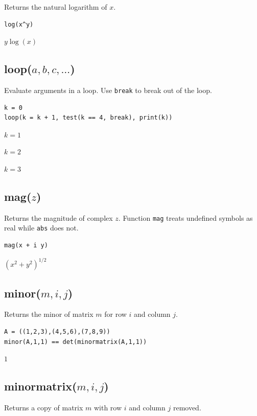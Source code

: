 \documentclass[12pt]{article}
\begin{document}
Returns the natural logarithm of $x$.

{\color{blue}
\begin{verbatim}
log(x^y)
\end{verbatim}
}

$y\log(x)$

\subsection*{loop($a,b,c,\ldots$)}

Evaluate arguments in a loop. Use \verb$break$ to break out of the loop.

{\color{blue}
\begin{verbatim}
k = 0
loop(k = k + 1, test(k == 4, break), print(k))
\end{verbatim}
}

$k=1$

$k=2$

$k=3$

\subsection*{mag($z$)}

Returns the magnitude of complex $z$.
Function {\tt mag} treats undefined symbols as real while {\tt abs} does not.

{\color{blue}
\begin{verbatim}
mag(x + i y)
\end{verbatim}
}

$\displaystyle (x^2+y^2)^{1/2}$

\subsection*{minor($m,i,j$)}

Returns the minor of matrix $m$ for row $i$ and column $j$.

{\color{blue}
\begin{verbatim}
A = ((1,2,3),(4,5,6),(7,8,9))
minor(A,1,1) == det(minormatrix(A,1,1))
\end{verbatim}
}

$1$

\subsection*{minormatrix($m,i,j$)}

Returns a copy of matrix $m$ with row $i$ and column $j$ removed.
\end{document}

